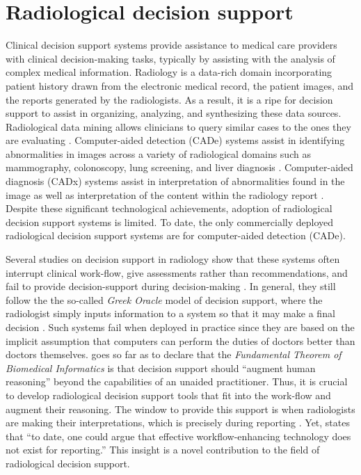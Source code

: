 \section{Radiological decision support}
Clinical decision support systems provide assistance to medical care providers with clinical decision-making tasks, typically by assisting with the analysis of complex medical information.
Radiology is a data-rich domain incorporating patient history drawn from the electronic medical record, the patient images, and the reports generated by the radiologists.
As a result, it is a ripe for decision support to assist in organizing, analyzing, and synthesizing these data sources.
Radiological data mining allows clinicians to query similar cases to the ones they are evaluating \cite{Shin:2015wl,Bozkurt:2014jw,Depeursinge:2012ce,Korenblum:2011gx,Akgul:2011ey,Nassif:2009du}.
Computer-aided detection (CADe) systems assist in identifying abnormalities in images across a variety of radiological domains such as mammography, colonoscopy, lung screening, and liver diagnosis \cite{Cheng:2003ig,Castellino:2005ke,Meeuwis:2010bv,Oliver:2010fm,Fenton:2011fw,Fenton:2012kz,Jamieson:2012hz,Gallas:2012eg,Giger:2013jb}.
Computer-aided diagnosis (CADx) systems assist in interpretation of abnormalities found in the image \cite{Jiang:1999fj,ElizabethS:2005gc,Gallas:2012eg,Bright:2012ga,Giger:2013jb,Depeursinge:2010jl,Fujita:2008it,Eadie:2011cv,Rubin:2005jg,Garg:2005cb,Elter:2009fv,Jamieson:2010vl,Jamieson:2010tt,Cheng:2003ig,Jiang:2001fy} as well as interpretation of the content within the radiology report \cite{Burnside:2000wl,ElizabethS:2005gc,Burnside:2009br,Rubin:2005jg}.
Despite these significant technological achievements, adoption of radiological decision support systems is limited.
To date, the only commercially deployed radiological decision support systems are for computer-aided detection (CADe).

Several studies on decision support in radiology show that these systems often interrupt clinical  work-flow, give assessments rather than recommendations, and fail to provide decision-support during decision-making \cite{Kawamoto:2005gn,Morgan:2011ct}.
In general, they still follow the the so-called \emph{Greek Oracle} model of decision support, where the radiologist simply inputs information to a system so that it may make a final decision \cite{Miller:1990wg,Miller:1994cx}.
Such systems fail when deployed in practice since they are based on the implicit assumption that computers can perform the duties of doctors better than doctors themselves.
 goes so far as to declare that the \emph{Fundamental Theorem of Biomedical Informatics} is that decision support should ``augment human reasoning'' beyond the capabilities of an unaided practitioner.
Thus, it is crucial to develop radiological decision support tools that fit into the work-flow and augment their reasoning.
The window to provide this support is when radiologists are making their interpretations, which is precisely during reporting \cite{Noumeir:2006cb}.
Yet,  states that ``to date, one could argue that effective workflow-enhancing technology does not exist for reporting.''
This insight is a novel contribution to the field of radiological decision support.


